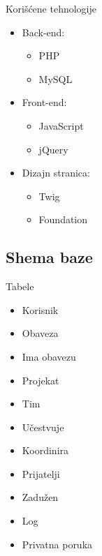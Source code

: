 \documentclass[xcolor={dvipsnames}, 11pt]{beamer}
\begin{document}
\begin{frame}{Kori\v s\' cene tehnologije}
	\begin{itemize}
		\item Back-end:
		\begin{itemize}
			\item PHP
			\item MySQL
		\end{itemize}
		
		\item Front-end:
		\begin{itemize}
			\item JavaScript
			\item jQuery
		\end{itemize}
		
		\item Dizajn stranica:
		\begin{itemize}
			\item Twig
			\item Foundation
		\end{itemize}
	\end{itemize}
	
\end{frame}

\subsection{Shema baze}

\begin{frame}{Tabele}
	\begin{multicols}{2}
		\begin{itemize}
			\item Korisnik
			\item Obaveza
			\item Ima obavezu
			\item Projekat
			\item Tim
			\item U\v cestvuje
			\item Koordinira
			\item Prijatelji
			\item Zadu\v zen
			\item Log
			\item Privatna poruka
		\end{itemize}
	\end{multicols}	
\end{frame}
\end{document}

